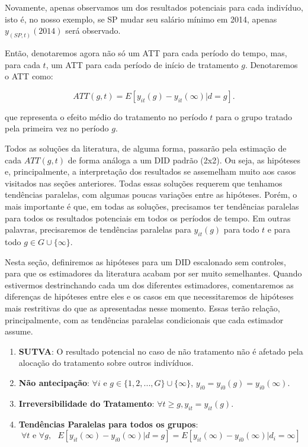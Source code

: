 \documentclass[portugues]{article}
\begin{document}
Novamente, apenas observamos um dos resultados potenciais para cada indivíduo, isto é, no nosso exemplo, se SP mudar seu salário mínimo em 2014, apenas $y_{(SP, t)} (2014)$ será observado. 

Então, denotaremos agora não só um ATT para cada período do tempo, mas, para cada $t$, um ATT para cada período de início de tratamento $g$. Denotaremos o ATT como:

    $$ ATT(g,t) = E[y_{it}(g) - y_{it}(\infty) | d = g]. $$

\noindent que representa o efeito médio do tratamento no período $t$ para o grupo tratado pela primeira vez no período $g$.

Todos as soluções da literatura, de alguma forma, passarão pela estimação de cada $ATT(g,t)$ de forma análoga a um DID padrão (2x2). Ou seja, as hipóteses e, principalmente, a interpretação dos resultados se assemelham muito aos casos visitados nas seções anteriores. Todas essas soluções requerem que tenhamos tendências paralelas, com algumas poucas variações entre as hipóteses. Porém, o mais importante é que, em  todas as soluções, precisamos ter tendências paralelas para todos os resultados potenciais em todos os períodos de tempo. Em outras palavras, precisaremos de tendências paralelas para $y_{it}(g)$ para todo $t$ e para todo $g \in G \cup \{\infty\}$.

Nesta seção, definiremos as hipóteses para um DID escalonado sem controles, para que os estimadores da literatura acabam por ser muito semelhantes. Quando estivermos destrinchando cada um dos diferentes estimadores, comentaremos as diferenças de hipóteses entre eles e os casos em que necessitaremos de hipóteses mais restritivas do que as apresentadas nesse momento. Essas terão relação, principalmente, com as tendências paralelas condicionais que cada estimador assume.

\begin{boxB}
\begin{enumerate}
    \item \textbf{SUTVA}: O resultado potencial no caso de não tratamento não é afetado pela alocação do tratamento sobre outros indivíduos.
    \item \textbf{Não antecipação}: $\forall i$ e $g \in \{1,2, ..., G\} \cup \{\infty\}$,  $y_{i0} = y_{i0}(g) =   y_{i0}(\infty)$.
    \item \textbf{Irreversibilidade do Tratamento}: $\forall t \geq g, y_{it} = y_{it}(g)$. 
    \item \textbf{Tendências Paralelas para todos os grupos}: 
    $$ \forall t \text{ e } \forall g, \text{ } E[y_{it}(\infty) - y_{i0}(\infty) | d=g] = E[y_{it}(\infty) - y_{i0}(\infty) | d_i = \infty] $$
\end{enumerate}

\end{boxB}
\end{document}
